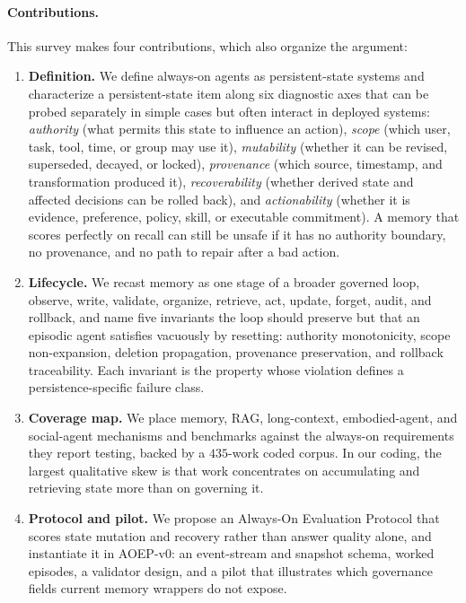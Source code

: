 \paragraph{Contributions.} This survey makes four contributions, which also organize the argument:

\begin{enumerate}
\item \textbf{Definition.} We define always-on agents as persistent-state systems and characterize a persistent-state item along six diagnostic axes that can be probed separately in simple cases but often interact in deployed systems: \emph{authority} (what permits this state to influence an action), \emph{scope} (which user, task, tool, time, or group may use it), \emph{mutability} (whether it can be revised, superseded, decayed, or locked), \emph{provenance} (which source, timestamp, and transformation produced it), \emph{recoverability} (whether derived state and affected decisions can be rolled back), and \emph{actionability} (whether it is evidence, preference, policy, skill, or executable commitment). A memory that scores perfectly on recall can still be unsafe if it has no authority boundary, no provenance, and no path to repair after a bad action.
\item \textbf{Lifecycle.} We recast memory as one stage of a broader governed loop, observe, write, validate, organize, retrieve, act, update, forget, audit, and rollback, and name five invariants the loop should preserve but that an episodic agent satisfies vacuously by resetting: authority monotonicity, scope non-expansion, deletion propagation, provenance preservation, and rollback traceability. Each invariant is the property whose violation defines a persistence-specific failure class.
\item \textbf{Coverage map.} We place memory, RAG, long-context, embodied-agent, and social-agent mechanisms and benchmarks against the always-on requirements they report testing, backed by a $435$-work coded corpus. In our coding, the largest qualitative skew is that work concentrates on accumulating and retrieving state more than on governing it.
\item \textbf{Protocol and pilot.} We propose an Always-On Evaluation Protocol that scores state mutation and recovery rather than answer quality alone, and instantiate it in AOEP-v0: an event-stream and snapshot schema, worked episodes, a validator design, and a pilot that illustrates which governance fields current memory wrappers do not expose.
\end{enumerate}


